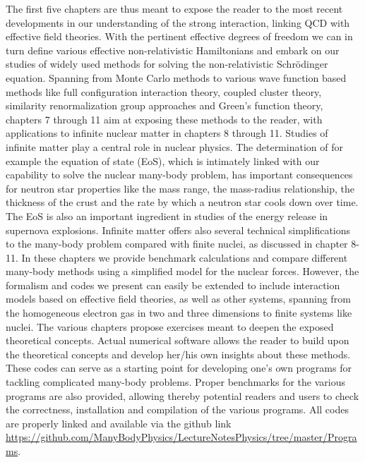 The first five chapters are thus meant to expose the reader to the
most recent developments in our understanding of the strong
interaction, linking QCD with effective field theories. With the
pertinent effective degrees of freedom we can in turn define various
effective non-relativistic Hamiltonians and embark on our studies of
widely used methods for solving the non-relativistic Schr\"odinger
equation. Spanning from Monte Carlo methods to various wave function
based methods like full configuration interaction theory, coupled
cluster theory, similarity renormalization group approaches and
Green's function theory, chapters 7 through 11 aim at exposing these
methods to the reader, with applications to infinite nuclear matter in
chapters 8 through 11. Studies of infinite matter play a central role
in nuclear physics. The determination of for example the equation of
state (EoS), which is intimately linked with our capability to solve
the nuclear many-body problem, has important consequences for neutron
star properties like the mass range, the mass-radius relationship, the
thickness of the crust and the rate by which a neutron star cools down
over time. The EoS is also an important ingredient in studies of the
energy release in supernova explosions. Infinite matter offers also
several technical simplifications to the many-body problem compared
with finite nuclei, as discussed in chapter 8-11. In these chapters we
provide benchmark calculations and compare different many-body methods
using a simplified model for the nuclear forces. However, the
formalism and codes we present can easily be extended to include
interaction models based on effective field theories, as well as other
systems, spanning from the homogeneous electron gas in two and three
dimensions to finite systems like nuclei.  The various chapters
propose exercises meant to deepen the exposed theoretical concepts.
Actual numerical software allows the reader to build upon the
theoretical concepts and develop her/his own insights about these
methods. These codes can serve as a starting point for developing
one's own programs for tackling complicated many-body problems.
Proper benchmarks for the various programs are also provided, allowing
thereby potential readers and users to check the correctness,
installation and compilation of the various programs. All codes are
properly linked and available via the github
link \url{https://github.com/ManyBodyPhysics/LectureNotesPhysics/tree/master/Programs}.


